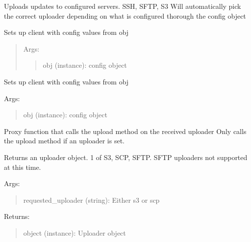 \documentclass[letterpaper,10pt,english]{sphinxmanual}
\begin{document}
\label{api:module-pyi_updater.uploader}

\begin{fulllineitems}
\label{api:pyi_updater.uploader.Uploader}
Uploads updates to configured servers.  SSH, SFTP, S3
Will automatically pick the correct uploader depending on
what is configured thorough the config object

Sets up client with config values from obj
\begin{quote}

Args:
\begin{quote}

obj (instance): config object
\end{quote}
\end{quote}

\begin{fulllineitems}
\label{api:pyi_updater.uploader.Uploader.init_app}
Sets up client with config values from obj

Args:
\begin{quote}

obj (instance): config object
\end{quote}

\end{fulllineitems}


\begin{fulllineitems}
\label{api:pyi_updater.uploader.Uploader.upload}
Proxy function that calls the upload method on the received uploader
Only calls the upload method if an uploader is set.

\end{fulllineitems}


\begin{fulllineitems}
\label{api:pyi_updater.uploader.Uploader.set_uploader}
Returns an uploader object. 1 of S3, SCP, SFTP.
SFTP uploaders not supported at this time.

Args:
\begin{quote}

requested\_uploader (string): Either s3 or scp
\end{quote}

Returns:
\begin{quote}

object (instance): Uploader object
\end{quote}

\end{fulllineitems}


\end{fulllineitems}
\end{document}
